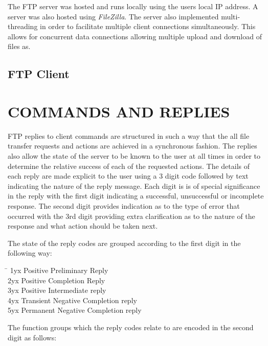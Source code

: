 \documentclass[10pt,twocolumn]{witseiepaper}
\begin{document}
The FTP server was hosted and runs locally using the users local IP address. A server was also hosted using \textit{FileZilla}. The server also implemented multi-threading in order to facilitate multiple client connections simultaneously. This allows for concurrent data connections allowing multiple upload and download of files as.  

\subsection{FTP Client}
\label{sec: FTP Client}


%
\section{COMMANDS AND REPLIES}
\label{sec: Commands and Replies}

FTP replies to client commands are structured in such a way that the all file transfer requests and actions are achieved in a synchronous fashion. The replies also allow the state of the server to be known to the user at all times in order to determine the relative success of each of the requested actions. The details of each reply are made explicit to the user using a 3 digit code followed by text indicating the nature of the reply message. Each digit is is of special significance in the reply with the first digit indicating a successful, unsuccessful or incomplete response. The second digit provides indication as to the type of error that occurred with the 3rd digit providing extra clarification as to the nature of the response and what action should be taken next.

The state of the reply codes are grouped according to the first digit in the following way:
\begin{tabbing}
	\hspace{4em}\=\kill
	1yx	\> Positive Preliminary Reply \\ 
	2yx	\> Positive Completion Reply\\ 
	3yx	\> Positive Intermediate reply \\ 
	4yx	\> Transient Negative Completion reply \\ 
	5yx	\> Permanent Negative Completion reply
\end{tabbing} 

The function groups which the reply codes relate to are encoded in the second digit as follows: 
\end{document}
